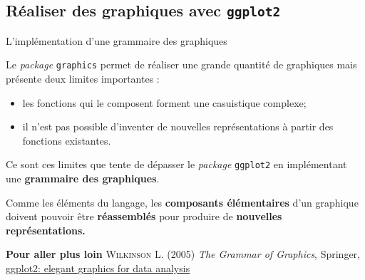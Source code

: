 \documentclass[12pt,ignorenonframetext,handout,]{beamer}
\providecommand{\tightlist}{%
  \setlength{\itemsep}{0pt}\setlength{\parskip}{0pt}}
\newcommand{\intertitre}[1]{\textcolor{redInsee}{\textbf{#1}}}
\begin{document}
\hypertarget{realiser-des-graphiques-avec}{%
\subsection{\texorpdfstring{Réaliser des graphiques avec
\protect\texttt{ggplot2}}{Réaliser des graphiques avec }}\label{realiser-des-graphiques-avec}}

\begin{frame}[fragile]{\large L’implémentation d’une grammaire des
graphiques}
\protect\hypertarget{limplementation-dune-grammaire-des-graphiques}{}

Le \emph{package} \texttt{graphics} permet de réaliser une grande
quantité de graphiques mais présente deux limites importantes :

\begin{itemize}
\tightlist
\item
  les fonctions qui le composent forment une casuistique complexe;
\item
  il n’est pas possible d’inventer de nouvelles représentations à partir
  des fonctions existantes.
\end{itemize}

\pause Ce sont ces limites que tente de dépasser le \emph{package}
\texttt{ggplot2} en implémentant une \textbf{grammaire des graphiques}.

Comme les éléments du langage, les \textbf{composants élémentaires} d’un
graphique doivent pouvoir être \textbf{réassemblés} pour produire de
\textbf{nouvelles représentations.}

\pause

\intertitre{Pour aller plus loin} \textsc{Wilkinson L.} (2005)
\textit{The Grammar of Graphics}, Springer,
\href{https://github.com/hadley/ggplot2-book}{\underline{ggplot2: elegant graphics for data analysis}}

\end{frame}
\end{document}
